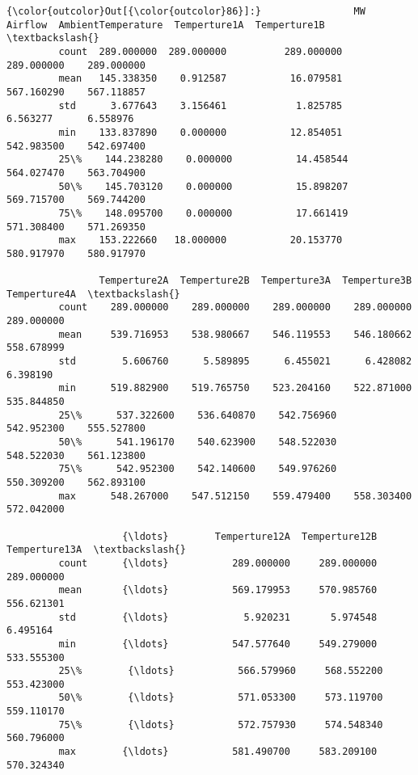 \documentclass[11pt]{article}
\begin{document}
\begin{Verbatim}[commandchars=\\\{\}]
{\color{outcolor}Out[{\color{outcolor}86}]:}                MW     Airflow  AmbientTemperature  Temperture1A  Temperture1B  \textbackslash{}
         count  289.000000  289.000000          289.000000    289.000000    289.000000   
         mean   145.338350    0.912587           16.079581    567.160290    567.118857   
         std      3.677643    3.156461            1.825785      6.563277      6.558976   
         min    133.837890    0.000000           12.854051    542.983500    542.697400   
         25\%    144.238280    0.000000           14.458544    564.027470    563.704900   
         50\%    145.703120    0.000000           15.898207    569.715700    569.744200   
         75\%    148.095700    0.000000           17.661419    571.308400    571.269350   
         max    153.222660   18.000000           20.153770    580.917970    580.917970   
         
                Temperture2A  Temperture2B  Temperture3A  Temperture3B  Temperture4A  \textbackslash{}
         count    289.000000    289.000000    289.000000    289.000000    289.000000   
         mean     539.716953    538.980667    546.119553    546.180662    558.678999   
         std        5.606760      5.589895      6.455021      6.428082      6.398190   
         min      519.882900    519.765750    523.204160    522.871000    535.844850   
         25\%      537.322600    536.640870    542.756960    542.952300    555.527800   
         50\%      541.196170    540.623900    548.522030    548.522030    561.123800   
         75\%      542.952300    542.140600    549.976260    550.309200    562.893100   
         max      548.267000    547.512150    559.479400    558.303400    572.042000   
         
                    {\ldots}        Temperture12A  Temperture12B  Temperture13A  \textbackslash{}
         count      {\ldots}           289.000000     289.000000     289.000000   
         mean       {\ldots}           569.179953     570.985760     556.621301   
         std        {\ldots}             5.920231       5.974548       6.495164   
         min        {\ldots}           547.577640     549.279000     533.555300   
         25\%        {\ldots}           566.579960     568.552200     553.423000   
         50\%        {\ldots}           571.053300     573.119700     559.110170   
         75\%        {\ldots}           572.757930     574.548340     560.796000   
         max        {\ldots}           581.490700     583.209100     570.324340   
         

\end{Verbatim}
\end{document}

